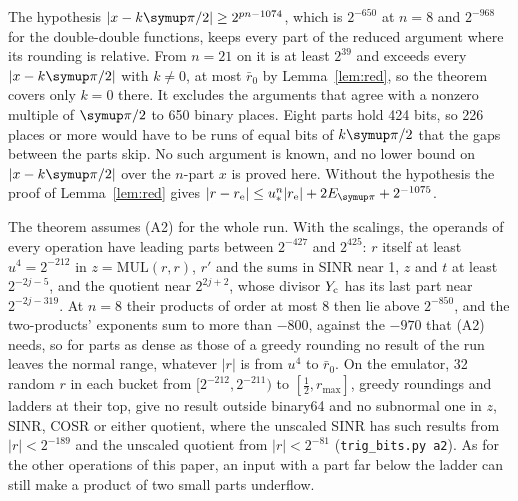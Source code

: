 \begin{remark}\label{rem:a2}
The hypothesis $|x - k\cpi/2| \ge 2^{pn-1074}$, which is $2^{-650}$ at $n = 8$ and $2^{-968}$ for the double-double
functions, keeps every part of the reduced argument where its rounding is relative. From $n = 21$ on it is at least
$2^{39}$ and exceeds every $|x - k\cpi/2|$ with $k \ne 0$, at most $\bar r_0$ by Lemma~\ref{lem:red}, so the theorem
covers only $k = 0$ there. It excludes the arguments that
agree with a nonzero multiple of $\cpi/2$ to 650 binary places. Eight parts hold 424 bits, so 226 places or more would
have to be runs of equal bits of $k\cpi/2$ that the gaps between the parts skip. No such argument is known, and no
lower bound on $|x - k\cpi/2|$ over the $n$-part $x$ is proved here. Without the hypothesis the proof of
Lemma~\ref{lem:red} gives $|r - r_{\rm e}| \le u_*^n|r_{\rm e}| + 2E_{\cpi} + 2^{-1075}$.

The theorem assumes (A2) for the whole run. With the scalings, the operands of every operation have leading parts
between $2^{-427}$ and $2^{425}$: $r$ itself at least $u^4 = 2^{-212}$ in $z = \mathrm{MUL}(r, r)$, $r'$ and the sums
in SINR near 1, $z$ and $t$ at least $2^{-2j-5}$, and the quotient near $2^{2j+2}$, whose divisor $Y_{\rm c}$
has its last part near $2^{-2j-319}$. At $n = 8$ their products of order at most 8 then lie above $2^{-850}$,
and the two-products' exponents sum to more than $-800$, against the $-970$ that (A2) needs, so for parts as dense as
those of a greedy rounding no result of the run leaves the normal range, whatever $|r|$ is from $u^4$ to $\bar r_0$. On the emulator, 32 random $r$ in each bucket from
$[2^{-212}, 2^{-211})$ to $[\frac12, r_{\max}]$, greedy roundings and ladders at their top, give no result outside binary64
and no subnormal one in $z$, SINR, COSR or either quotient, where the unscaled SINR has such results from $|r| <
2^{-189}$ and the unscaled quotient from $|r| < 2^{-81}$ (\texttt{trig\_bits.py a2}). As for the other operations of
this paper, an input with a part far below the ladder can still make a product of two small parts underflow.
\end{remark}
